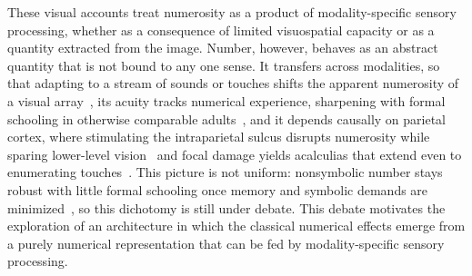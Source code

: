 \documentclass[Afour,sageh,times]{sagej}
\begin{document}
These visual accounts treat numerosity as a product of modality-specific sensory processing, whether as a consequence of limited visuospatial capacity or as a quantity extracted from the image. Number, however, behaves as an abstract quantity that is not bound to any one sense. It transfers across modalities, so that adapting to a stream of sounds or touches shifts the apparent numerosity of a visual array~\citep{arrighi_generalized_2014}, its acuity tracks numerical experience, sharpening with formal schooling in otherwise comparable adults~\citep{piazza_education_2013, nys_does_2013}, and it depends causally on parietal cortex, where stimulating the intraparietal sulcus disrupts numerosity while sparing lower-level vision~\citep{cappelletti_rtms_2007, dormal_contribution_2012} and focal damage yields acalculias that extend even to enumerating touches~\citep{ashkenazi_basic_2008, cohen_tactile_2018}. This picture is not uniform: nonsymbolic number stays robust with little formal schooling once memory and symbolic demands are minimized~\citep{frank_number_2008, zebian_differences_2012, pica_exact_2004}, so this dichotomy is still under debate. This debate motivates the exploration of an architecture in which the classical numerical effects emerge from a purely numerical representation that can be fed by modality-specific sensory processing.
\end{document}
